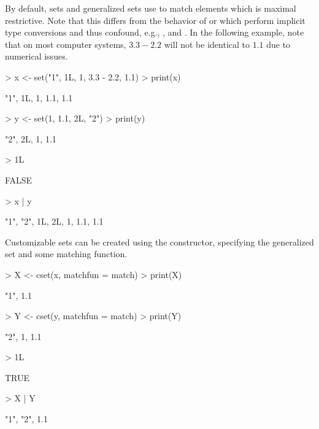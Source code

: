 \documentclass[article]{jss}
\newcommand{\codefun}[1]{\code{#1()}}
\begin{document}
By default, sets and generalized sets use
\codefun{identical} to match elements which is maximal
restrictive. Note that this differs from the behavior of
 or \codefun{match} which perform implicit type conversions
and thus confound, e.g., ,  and . In the
following example, note that on most computer systems, $3.3-2.2$ will not be
identical to $1.1$ due to numerical issues.
\begin{Schunk}
\begin{Sinput}
> x <- set("1", 1L, 1, 3.3 - 2.2, 1.1)
> print(x)
\end{Sinput}
\begin{Soutput}
{"1", 1L, 1, 1.1, 1.1}
\end{Soutput}
\begin{Sinput}
> y <- set(1, 1.1, 2L, "2")
> print(y)
\end{Sinput}
\begin{Soutput}
{"2", 2L, 1, 1.1}
\end{Soutput}
\begin{Sinput}
> 1L %
\end{Sinput}
\begin{Soutput}
[1] FALSE
\end{Soutput}
\begin{Sinput}
> x | y
\end{Sinput}
\begin{Soutput}
{"1", "2", 1L, 2L, 1, 1.1, 1.1}
\end{Soutput}
\end{Schunk}
Customizable sets can be created using the \codefun{cset} constructor,
specifying the generalized set and some matching function.
\begin{Schunk}
\begin{Sinput}
> X <- cset(x, matchfun = match)
> print(X)
\end{Sinput}
\begin{Soutput}
{"1", 1.1}
\end{Soutput}
\begin{Sinput}
> Y <- cset(y, matchfun = match)
> print(Y)
\end{Sinput}
\begin{Soutput}
{"2", 1, 1.1}
\end{Soutput}
\begin{Sinput}
> 1L %
\end{Sinput}
\begin{Soutput}
[1] TRUE
\end{Soutput}
\begin{Sinput}
> X | Y
\end{Sinput}
\begin{Soutput}
{"1", "2", 1.1}
\end{Soutput}
\end{Schunk}
\end{document}
